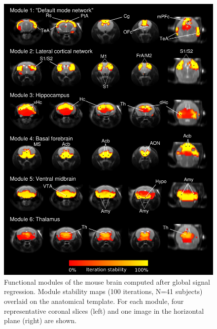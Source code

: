 \begin{figure}[th]
    \centering
    \includegraphics[scale=0.7]{figures/hubs_figure_s2_GSR_modules.png}
    \decoRule
    \caption[Functional modules of the mouse brain computed after global signal
    regression.]{Functional modules of the mouse brain computed after global
    signal regression. Module stability maps (100 iterations, N=41 subjects)
    overlaid on the anatomical template. For each module, four representative
    coronal slices (left) and one image in the horizontal plane (right) are
    shown.}
    \label{fig:hubs_figs2_gsr_modules}
\end{figure}

